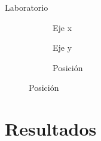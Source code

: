 \documentclass{beamer}
\begin{document}
  \begin{frame}{Laboratorio}
    \begin{figure}[H]
      \centering
        \begin{subfigure}[b]{.3\textwidth}
          \centering
          \hspace*{-0.8cm}
           
          \vspace*{-0.5cm}
          \caption{Eje x}
          \label{fig:boxplot_lab_x}
        \end{subfigure}
        \hspace*{0.1cm}
        \begin{subfigure}[b]{.3\textwidth}
          \centering
            
          \vspace*{-0.5cm}
          \caption{Eje y}
          \label{fig:boxplot_lab_y}
        \end{subfigure}
        \hspace*{0.1cm}
        \begin{subfigure}[b]{.3\textwidth}
            \centering
              
            \caption{Posición}
            \label{fig:boxplot_lab_pos}
          \end{subfigure}
        \label{fig:boxplot_lab}
    \end{figure}
  \end{frame}
  

  \section[Edificio de Física]{Resultados}
\end{document}
